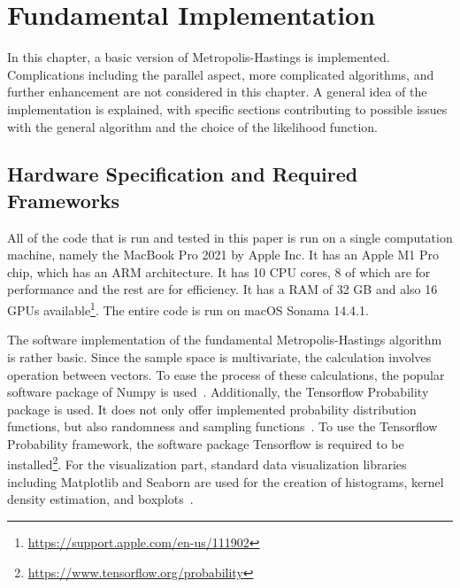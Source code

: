 \chapter{Fundamental Implementation}
In this chapter, a basic version of Metropolis-Hastings is implemented. Complications including the parallel aspect, more complicated algorithms, and further enhancement are not considered in this chapter. A general idea of the implementation is explained, with specific sections contributing to possible issues with the general algorithm and the choice of the likelihood function.

\section{Hardware Specification and Required Frameworks}
All of the code that is run and tested in this paper is run on a single computation machine, namely the MacBook Pro 2021 by Apple Inc. It has an Apple M1 Pro chip, which has an ARM architecture. It has 10 CPU cores, 8 of which are for performance and the rest are for efficiency. It has a RAM of 32 GB and also 16 GPUs available\footnote{\url{https://support.apple.com/en-us/111902}}. The entire code is run on macOS Sonama 14.4.1.

The software implementation of the fundamental Metropolis-Hastings algorithm is rather basic. Since the sample space is multivariate, the calculation involves operation between vectors. To ease the process of these calculations, the popular software package of Numpy is used~\cite{numpy}. Additionally, the Tensorflow Probability package is used. It does not only offer implemented probability distribution functions, but also randomness and sampling functions~\cite{tfp}. To use the Tensorflow Probability framework, the software package Tensorflow is required to be installed\footnote{\url{https://www.tensorflow.org/probability}}. For the visualization part, standard data visualization libraries including Matplotlib and Seaborn are used for the creation of histograms, kernel density estimation, and boxplots~\cite{plt}.


